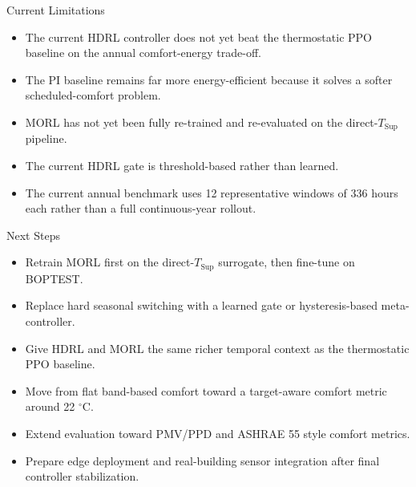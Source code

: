 \documentclass[aspectratio=169,11pt]{beamer}
\newcommand{\degc}{\ensuremath{^\circ\mathrm{C}}}
\begin{document}
\begin{frame}{Current Limitations}
  \begin{itemize}
    \item The current HDRL controller does not yet beat the thermostatic PPO baseline on the annual comfort-energy trade-off.
    \item The PI baseline remains far more energy-efficient because it solves a softer scheduled-comfort problem.
    \item MORL has not yet been fully re-trained and re-evaluated on the direct-$T_{\mathrm{Sup}}$ pipeline.
    \item The current HDRL gate is threshold-based rather than learned.
    \item The current annual benchmark uses 12 representative windows of 336 hours each rather than a full continuous-year rollout.
  \end{itemize}
\end{frame}

\begin{frame}{Next Steps}
  \begin{itemize}
    \item Retrain MORL first on the direct-$T_{\mathrm{Sup}}$ surrogate, then fine-tune on BOPTEST.
    \item Replace hard seasonal switching with a learned gate or hysteresis-based meta-controller.
    \item Give HDRL and MORL the same richer temporal context as the thermostatic PPO baseline.
    \item Move from flat band-based comfort toward a target-aware comfort metric around 22 \degc{}.
    \item Extend evaluation toward PMV/PPD and ASHRAE 55 style comfort metrics.
    \item Prepare edge deployment and real-building sensor integration after final controller stabilization.
  \end{itemize}
\end{frame}
\end{document}
